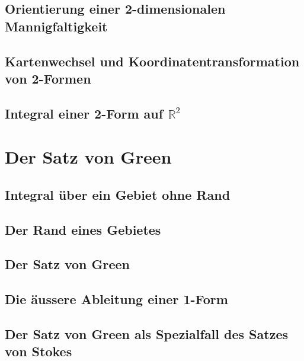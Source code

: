 \subsection{Orientierung einer 2-dimensionalen Mannigfaltigkeit}

\subsection{Kartenwechsel und Koordinatentransformation von 2-Formen}

\subsection{Integral einer 2-Form auf $\mathbb{R}^2$}

%
%
\section{Der Satz von Green
\label{buch:green:section:green}}

\subsection{Integral über ein Gebiet ohne Rand}

\subsection{Der Rand eines Gebietes}

\subsection{Der Satz von Green}

\subsection{Die äussere Ableitung einer 1-Form}

\subsection{Der Satz von Green als Spezialfall des Satzes von Stokes}


